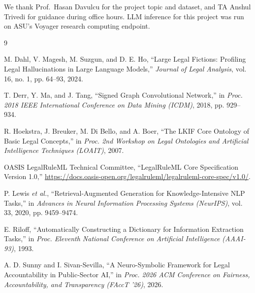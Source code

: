 \documentclass[10pt,conference]{IEEEtran}
\begin{document}
We thank Prof.\ Hasan Davulcu for the project topic and dataset, and TA Anshul Trivedi for
guidance during office hours. LLM inference for this project was run on ASU's Voyager
research computing endpoint.

\begin{thebibliography}{9}

M. Dahl, V. Magesh, M. Suzgun, and D. E. Ho, ``Large Legal Fictions: Profiling Legal
Hallucinations in Large Language Models,'' \emph{Journal of Legal Analysis}, vol. 16,
no. 1, pp. 64--93, 2024.

T. Derr, Y. Ma, and J. Tang, ``Signed Graph Convolutional Network,'' in \emph{Proc. 2018
IEEE International Conference on Data Mining (ICDM)}, 2018, pp. 929--934.

R. Hoekstra, J. Breuker, M. Di Bello, and A. Boer, ``The LKIF Core Ontology of Basic Legal
Concepts,'' in \emph{Proc. 2nd Workshop on Legal Ontologies and Artificial Intelligence
Techniques (LOAIT)}, 2007.

OASIS LegalRuleML Technical Committee, ``LegalRuleML Core Specification Version 1.0,''
\url{https://docs.oasis-open.org/legalruleml/legalruleml-core-spec/v1.0/}.

P. Lewis \emph{et al.}, ``Retrieval-Augmented Generation for Knowledge-Intensive NLP
Tasks,'' in \emph{Advances in Neural Information Processing Systems (NeurIPS)}, vol. 33,
2020, pp. 9459--9474.

E. Riloff, ``Automatically Constructing a Dictionary for Information Extraction Tasks,''
in \emph{Proc. Eleventh National Conference on Artificial Intelligence (AAAI-93)}, 1993.

A. D. Sunny and I. Sivan-Sevilla, ``A Neuro-Symbolic Framework for Legal Accountability in
Public-Sector AI,'' in \emph{Proc. 2026 ACM Conference on Fairness, Accountability, and
Transparency (FAccT '26)}, 2026.

\end{thebibliography}
\end{document}
